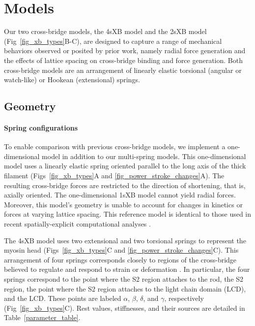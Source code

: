 \documentclass[10pt]{article}
\newcommand{\citep}[1]{\cite{#1}} %
\begin{document}


\section*{Models}  %

Our two cross-bridge models, the 4sXB model and the 2sXB model (Fig~\ref{fig_xb_types}B-C), are designed to capture a range of mechanical behaviors observed or posited by prior work, namely radial force generation and the effects of lattice spacing on cross-bridge binding and force generation.  
Both cross-bridge models are an arrangement of linearly elastic torsional (angular or watch-like) or Hookean (extensional) springs.  

\subsection*{Geometry} %

\paragraph{Spring configurations} %
To enable comparison with previous cross-bridge models, we implement a one-dimensional model in addition to our multi-spring models. 
This one-dimensional model uses a linearly elastic spring oriented parallel to the long axis of the thick filament (Figs~\ref{fig_xb_types}A and \ref{fig_power_stroke_changes}A).  
The resulting cross-bridge forces are restricted to the direction of shortening, that is, axially oriented. 
The one-dimensional 1sXB model cannot yield radial forces.
Moreover, this model's geometry is unable to account for changes in kinetics or forces at varying lattice spacing. 
This reference model is identical to those used in recent spatially-explicit computational analyses \citep{Daniel1998, Chase2004, Tanner2007}. 

The 4sXB model uses two extensional and two torsional springs to represent the myosin head (Figs~\ref{fig_xb_types}C and \ref{fig_power_stroke_changes}C).
This arrangement of four springs corresponds closely to regions of the cross-bridge believed to regulate and respond to strain or deformation \citep{Houdusse2001}.
In particular, the four springs correspond to the point where the S2 region attaches to the rod, the S2 region, the point where the S2 region attaches to the light chain domain (LCD), and the LCD.
These points are labeled $\alpha$, $\beta$, $\delta$, and $\gamma$, respectively (Fig~\ref{fig_xb_types}C).
Rest values, stiffnesses, and their sources are detailed in Table~\ref{parameter_table}. 
\end{document}
